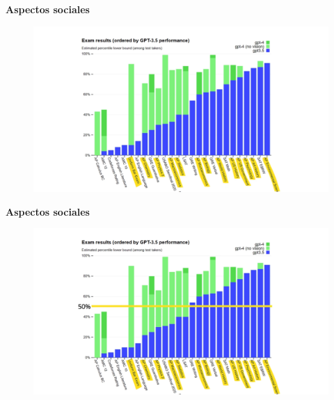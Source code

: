 \documentclass{beamer}
\begin{document}
\begin{frame}{\bfseries Aspectos sociales}
    \begin{figure}
        \centering
        \includegraphics[width=1\linewidth]{tests-2.png}
        \captionsetup{labelformat=empty}
    \end{figure}
\end{frame}

\begin{frame}{\bfseries Aspectos sociales}
    \begin{figure}
        \centering
        \includegraphics[width=1\linewidth]{tests-3.png}
        \captionsetup{labelformat=empty}
    \end{figure}
\end{frame}




% 
% 
\end{document}
